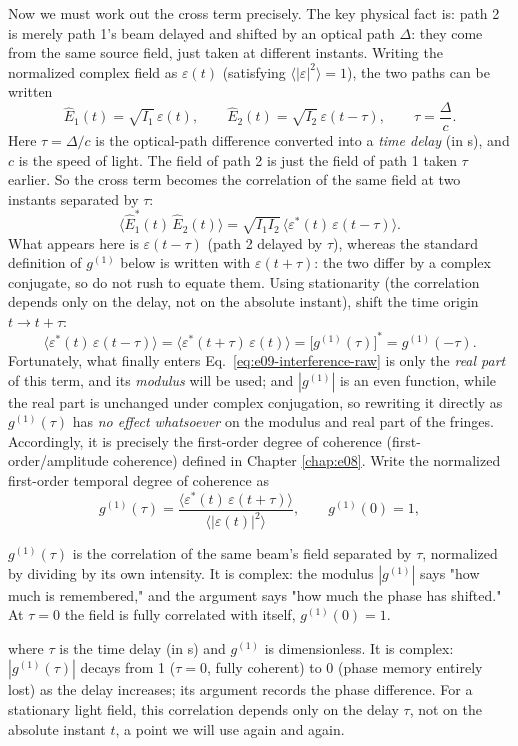 Now we must work out the cross term precisely. The key physical fact is: path 2 is merely path 1's beam delayed and shifted by an optical path \(\Delta\): they come from the same source field, just taken at different instants. Writing the normalized complex field as \(\varepsilon(t)\) (satisfying \(\langle|\varepsilon|^2\rangle=1\)), the two paths can be written
\[
  \hat E_1(t)=\sqrt{I_1}\,\varepsilon(t),\qquad
  \hat E_2(t)=\sqrt{I_2}\,\varepsilon(t-\tau),\qquad
  \tau=\frac{\Delta}{c}.
\]
Here \(\tau=\Delta/c\) is the optical-path difference converted into a \emph{time delay} (in s), and \(c\) is the speed of light. The field of path 2 is just the field of path 1 taken \(\tau\) earlier. So the cross term becomes the correlation of the same field at two instants separated by \(\tau\):
\[
  \big\langle \hat E_1^\ast(t)\,\hat E_2(t)\big\rangle
  =\sqrt{I_1 I_2}\,\big\langle \varepsilon^\ast(t)\,\varepsilon(t-\tau)\big\rangle .
\]
What appears here is \(\varepsilon(t-\tau)\) (path 2 delayed by \(\tau\)), whereas the standard definition of \(g^{(1)}\) below is written with \(\varepsilon(t+\tau)\): the two differ by a complex conjugate, so do not rush to equate them. Using stationarity (the correlation depends only on the delay, not on the absolute instant), shift the time origin \(t\to t+\tau\):
\[
  \big\langle \varepsilon^\ast(t)\,\varepsilon(t-\tau)\big\rangle
  =\big\langle \varepsilon^\ast(t+\tau)\,\varepsilon(t)\big\rangle
  =\big[g^{(1)}(\tau)\big]^\ast=g^{(1)}(-\tau) .
\]
Fortunately, what finally enters Eq.~\eqref{eq:e09-interference-raw} is only the \emph{real part} of this term, and its \emph{modulus} will be used; and \(|g^{(1)}|\) is an even function, while the real part is unchanged under complex conjugation, so rewriting it directly as \(g^{(1)}(\tau)\) has \emph{no effect whatsoever} on the modulus and real part of the fringes. Accordingly, it is precisely the first-order degree of coherence (first-order/amplitude coherence) defined in Chapter \ref{chap:e08}. Write the normalized first-order temporal degree of coherence as
\begin{equation}
  g^{(1)}(\tau)=
  \frac{\big\langle \varepsilon^\ast(t)\,\varepsilon(t+\tau)\big\rangle}
       {\big\langle |\varepsilon(t)|^2\big\rangle},
  \qquad g^{(1)}(0)=1 ,
  \label{eq:e09-g1-def}
\end{equation}
\begin{formulaexplain}
\(g^{(1)}(\tau)\) is the correlation of the same beam's field separated by \(\tau\), normalized by dividing by its own intensity. It is complex: the modulus \(|g^{(1)}|\) says "how much is remembered," and the argument says "how much the phase has shifted." At \(\tau=0\) the field is fully correlated with itself, \(g^{(1)}(0)=1\).
\end{formulaexplain}
where \(\tau\) is the time delay (in s) and \(g^{(1)}\) is dimensionless. It is complex: \(|g^{(1)}(\tau)|\) decays from 1 (\(\tau=0\), fully coherent) to 0 (phase memory entirely lost) as the delay increases; its argument records the phase difference. For a stationary light field, this correlation depends only on the delay \(\tau\), not on the absolute instant \(t\), a point we will use again and again.

